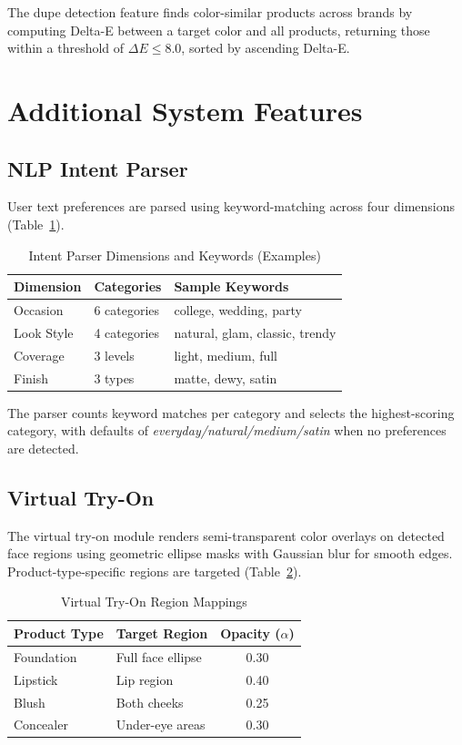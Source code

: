 \documentclass[conference]{IEEEtran}
\begin{document}
The dupe detection feature finds color-similar products across brands by computing Delta-E between a target color and all products, returning those within a threshold of $\Delta E \leq 8.0$, sorted by ascending Delta-E.

\section{Additional System Features}

\subsection{NLP Intent Parser}

User text preferences are parsed using keyword-matching across four dimensions (Table~\ref{tab:intent_dims}).

\begin{table}[t]
\centering
\caption{Intent Parser Dimensions and Keywords (Examples)}
\label{tab:intent_dims}
\begin{tabular}{lll}
\toprule
\textbf{Dimension} & \textbf{Categories} & \textbf{Sample Keywords} \\
\midrule
Occasion & 6 categories & college, wedding, party \\
Look Style & 4 categories & natural, glam, classic, trendy \\
Coverage & 3 levels & light, medium, full \\
Finish & 3 types & matte, dewy, satin \\
\bottomrule
\end{tabular}
\end{table}

The parser counts keyword matches per category and selects the highest-scoring category, with defaults of \textit{everyday/natural/medium/satin} when no preferences are detected.

\subsection{Virtual Try-On}

The virtual try-on module renders semi-transparent color overlays on detected face regions using geometric ellipse masks with Gaussian blur for smooth edges. Product-type-specific regions are targeted (Table~\ref{tab:tryon_regions}).

\begin{table}[t]
\centering
\caption{Virtual Try-On Region Mappings}
\label{tab:tryon_regions}
\begin{tabular}{llc}
\toprule
\textbf{Product Type} & \textbf{Target Region} & \textbf{Opacity ($\alpha$)} \\
\midrule
Foundation & Full face ellipse & 0.30 \\
Lipstick & Lip region & 0.40 \\
Blush & Both cheeks & 0.25 \\
Concealer & Under-eye areas & 0.30 \\
\bottomrule
\end{tabular}
\end{table}
\end{document}
